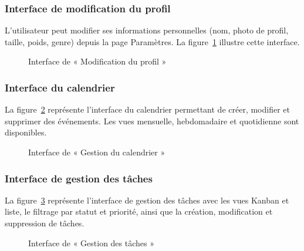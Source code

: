 \subsubsection{Interface de modification du profil}

L'utilisateur peut modifier ses informations personnelles (nom, photo de profil, taille, poids, genre) depuis la page Paramètres. La figure~\ref{fig:settings} illustre cette interface.

\begin{figure}[H]
\centering
\caption{Interface de « Modification du profil »}
\label{fig:settings}
\end{figure}

\subsubsection{Interface du calendrier}

La figure~\ref{fig:calendar} représente l'interface du calendrier permettant de créer, modifier et supprimer des événements. Les vues mensuelle, hebdomadaire et quotidienne sont disponibles.

\begin{figure}[H]
\centering
\caption{Interface de « Gestion du calendrier »}
\label{fig:calendar}
\end{figure}

\subsubsection{Interface de gestion des tâches}

La figure~\ref{fig:tasks} représente l'interface de gestion des tâches avec les vues Kanban et liste, le filtrage par statut et priorité, ainsi que la création, modification et suppression de tâches.

\begin{figure}[H]
\centering
\caption{Interface de « Gestion des tâches »}
\label{fig:tasks}
\end{figure}

